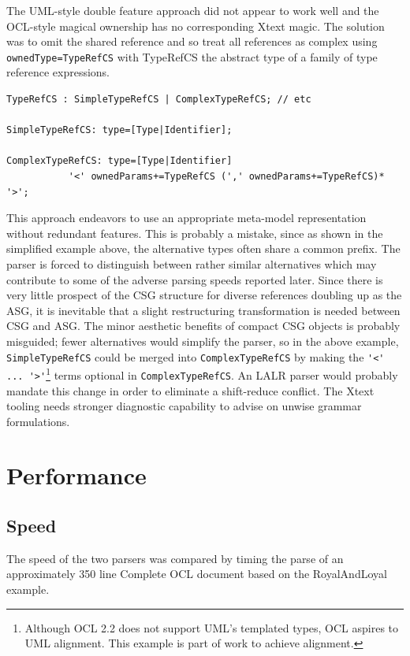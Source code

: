 \documentclass[runningheads,a4paper]{llncs}
\begin{document}
The UML-style double feature approach did not appear to work well and the OCL-style magical ownership has no corresponding Xtext magic. The solution was to omit the shared reference and so treat all references as complex using \verb+ownedType=TypeRefCS+ with TypeRefCS the abstract type of a family of type reference expressions.

{\small\begin{verbatim}
TypeRefCS : SimpleTypeRefCS | ComplexTypeRefCS; // etc

SimpleTypeRefCS: type=[Type|Identifier];

ComplexTypeRefCS: type=[Type|Identifier]
           '<' ownedParams+=TypeRefCS (',' ownedParams+=TypeRefCS)* '>';
\end{verbatim}}

This approach endeavors to use an appropriate meta-model representation without redundant features. This is probably a mistake, since as shown in the simplified example above, the alternative types often share a common prefix. The parser is forced to distinguish between rather similar alternatives which may contribute to some of the adverse parsing speeds reported later. Since there is very little prospect of the CSG structure for diverse references doubling up as the ASG, it is inevitable that a slight restructuring transformation is needed between CSG and ASG. The minor aesthetic benefits of compact CSG objects is probably misguided; fewer alternatives would simplify the parser, so in the above example, \verb+SimpleTypeRefCS+ could be merged into \verb+ComplexTypeRefCS+ by making the \verb+'<' ... '>'+\footnote{Although OCL 2.2 does not support UML's templated types, OCL aspires to UML alignment. This  example is part of work to achieve alignment.} terms optional in \verb+ComplexTypeRefCS+. An LALR parser would probably mandate this change in order to eliminate a shift-reduce conflict. The Xtext tooling needs stronger diagnostic capability to advise on unwise grammar formulations. 

\section{Performance}

\subsection{Speed}

The speed of the two parsers was compared by timing the parse of an approximately 350 line Complete OCL document based on the RoyalAndLoyal example.
\end{document}

